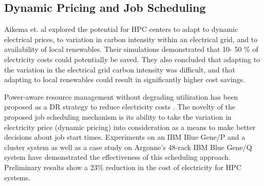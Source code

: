 \subsection{Dynamic Pricing and Job Scheduling}
Aikema et. al \cite{aikema_electrical_2011} explored the potential for HPC centers to adapt to dynamic electrical prices, to variation in carbon intensity within an electrical grid, and to availability of local renewables. Their simulations demonstrated that 10- 50 \% of electricity costs could potentially be saved. They also concluded that adapting to the variation in the electrical grid carbon intensity was difficult, and that adapting to local renewables could result in significantly higher cost savings.

Power-aware resource management without degrading utilization has been proposed as a DR strategy to reduce electricity costs \cite{yang_integrating_2013,zhou_reducing_2013}. The novelty of the proposed job scheduling mechanism is its ability to take the variation in electricity price (dynamic pricing) into consideration as a means to make better decisions about job start times. Experiments on an IBM Blue Gene/P and a cluster system as well as a case study on Argonne's 48-rack IBM Blue Gene/Q system have demonstrated the effectiveness of this scheduling approach. Preliminary results show a 23\% reduction in the cost of electricity for HPC systems.